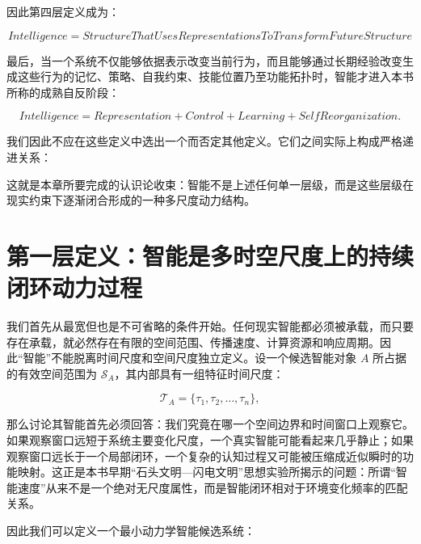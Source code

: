 \begin{statementbox}
\centering
{}
\end{statementbox}

因此第四层定义成为：

\[
\boxed{
Intelligence
=
StructureThatUsesRepresentations
ToTransformFutureStructure
}
\]

最后，当一个系统不仅能够依据表示改变当前行为，而且能够通过长期经验改变生成这些行为的记忆、策略、自我约束、技能位置乃至功能拓扑时，智能才进入本书所称的成熟自反阶段：

\[
\boxed{
Intelligence
=
Representation
+
Control
+
Learning
+
SelfReorganization.
}
\]

我们因此不应在这些定义中选出一个而否定其他定义。它们之间实际上构成严格递进关系：

\begin{statementbox}
\centering
{}
\end{statementbox}

这就是本章所要完成的认识论收束：智能不是上述任何单一层级，而是这些层级在现实约束下逐渐闭合形成的一种多尺度动力结构。

\section{第一层定义：智能是多时空尺度上的持续闭环动力过程}

我们首先从最宽但也是不可省略的条件开始。任何现实智能都必须被承载，而只要存在承载，就必然存在有限的空间范围、传播速度、计算资源和响应周期。因此“智能”不能脱离时间尺度和空间尺度独立定义。设一个候选智能对象 \(A\) 所占据的有效空间范围为 \(\mathcal S_A\)，其内部具有一组特征时间尺度：

\[
\mathcal T_A
=
\{
\tau_1,\tau_2,\ldots,\tau_n
\},
\]

那么讨论其智能首先必须回答：我们究竟在哪一个空间边界和时间窗口上观察它。如果观察窗口远短于系统主要变化尺度，一个真实智能可能看起来几乎静止；如果观察窗口远长于一个局部闭环，一个复杂的认知过程又可能被压缩成近似瞬时的功能映射。这正是本书早期“石头文明—闪电文明”思想实验所揭示的问题：所谓“智能速度”从来不是一个绝对无尺度属性，而是智能闭环相对于环境变化频率的匹配关系。

因此我们可以定义一个最小动力学智能候选系统：

